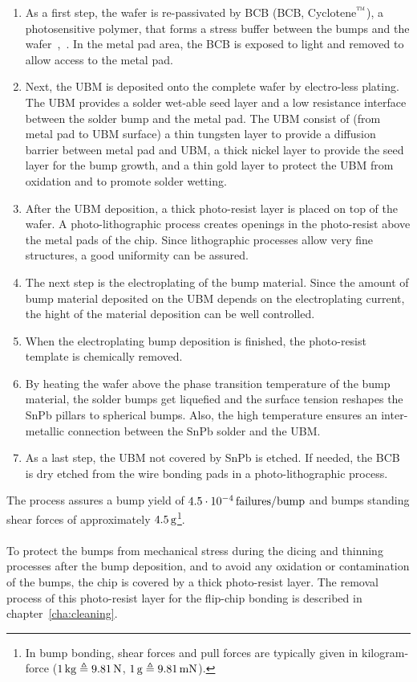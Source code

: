 \begin{enumerate}
\item As a first step, the wafer is re-passivated by \acl{BCB} (\acs{BCB}, Cyclotene$\rm{\symbTM}$), a photosensitive polymer, that forms a stress buffer between the bumps and the wafer~\cite{Bur90},~\cite{Dow14}. In the metal pad area, the \acs{BCB} is exposed to light and removed to allow access to the metal pad.
\item Next, the \ac{UBM} is deposited onto the complete wafer by electro-less plating. The \ac{UBM} provides a solder wet-able seed layer and a low resistance interface between the solder bump and the metal pad. The \ac{UBM} consist of (from metal pad to \ac{UBM} surface) a thin tungsten layer to provide a diffusion barrier between metal pad and \ac{UBM}, a thick nickel layer to provide the seed layer for the bump growth, and a thin gold layer to protect the \ac{UBM} from oxidation and to promote solder wetting.
\item After the \ac{UBM} deposition, a thick photo-resist layer is placed on top of the wafer. A photo-lithographic process creates openings in the photo-resist above the metal pads of the chip. Since lithographic processes allow very fine structures, a good uniformity can be assured.
\item The next step is the electroplating of the bump material. Since the amount of bump material deposited on the \ac{UBM} depends on the electroplating current, the hight of the material deposition can be well controlled.
\item When the electroplating bump deposition is finished, the photo-resist template is chemically removed.
\item By heating the wafer above the phase transition temperature of the bump material, the solder bumps get liquefied and the surface tension reshapes the SnPb pillars to spherical bumps. Also, the high temperature ensures an inter-metallic connection between the SnPb solder and the \ac{UBM}.
\item As a last step, the \ac{UBM} not covered by SnPb is etched. If needed, the \acs{BCB} is dry etched from the wire bonding pads in a photo-lithographic process.
\end{enumerate}
The process assures a bump yield of $4.5\cdot 10^{-4}\,\rm{failures}/{bump}$ and bumps standing shear forces of approximately $4.5\,\rm{g}$\footnote{In bump bonding, shear forces and pull forces are typically given in kilogram-force ($1\,\rm{kg}\triangleq 9.81\,\rm{N}$, $1\,\rm{g}\triangleq 9.81\,\rm{mN}$).}.\\
\\To protect the bumps from mechanical stress during the dicing and thinning processes after the bump deposition, and to avoid any oxidation or contamination of the bumps, the chip is covered by a thick photo-resist layer. The removal process of this photo-resist layer for the flip-chip bonding is described in chapter~\ref{cha:cleaning}.



